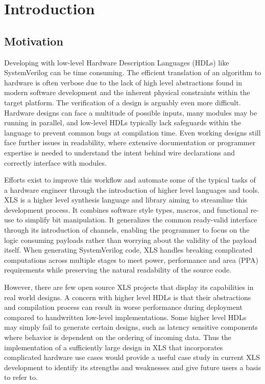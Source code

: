 \chapter{Introduction}
\section{Motivation}
Developing with low-level Hardware Description Languages (HDLs) like SystemVerilog can be time consuming. The efficient translation of an algorithm to hardware is often verbose due to the lack of high level abstractions found in modern software development and the inherent physical constraints within the target platform. The verification of a design is arguably even more difficult. Hardware designs can face a multitude of possible inputs, many modules may be running in parallel, and low-level HDLs typically lack safeguards within the language to prevent common bugs at compilation time. Even working designs still face further issues in readability, where extensive documentation or programmer expertise is needed to understand the intent behind wire declarations and correctly interface with modules. 

Efforts exist to improve this workflow and automate some of the typical tasks of a hardware engineer through the introduction of higher level languages and tools. XLS is a higher level synthesis language and library aiming to streamline this development process. It combines software style types, macros, and functional re-use to simplify bit manipulation. It generalizes the common ready-valid interface through its introduction of channels, enabling the programmer to focus on the logic consuming payloads rather than worrying about the validity of the payload itself. When generating SystemVerilog code, XLS handles breaking complicated computations across multiple stages to meet power, performance and area (PPA) requirements while preserving the natural readability of the source code.

However, there are few open source XLS projects that display its capabilities in real world designs. A concern with higher level HDLs is that their abstractions and compilation process can result in worse performance during deployment compared to handwritten low-level implementations. Some higher level HDLs may simply fail to generate certain designs, such as latency sensitive components where behavior is dependent on the ordering of incoming data. Thus the implementation of a sufficiently large design in XLS that incorporates complicated hardware use cases would provide a useful case study in current XLS development to identify its strengths and weaknesses and give future users a basis to refer to.

